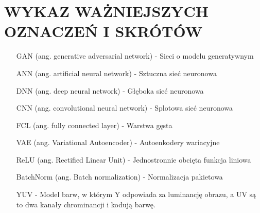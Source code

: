 \section*{WYKAZ WAŻNIEJSZYCH OZNACZEŃ I SKRÓTÓW}

  \bigskip

  \begin{itemize}
    \item[GAN] (ang. generative adversarial network) - Sieci o modelu generatywnym
    \item[ANN] (ang. artificial neural network) - Sztuczna sieć neuronowa
    \item[DNN] (ang. deep neural network) - Głęboka sieć neuronowa
    \item[CNN] (ang. convolutional neural network) - Splotowa sieć neuronowa
    \item[FCL] (ang. fully connected layer) - Warstwa gęsta
    \item[VAE] (ang. Variational Autoencoder) - Autoenkodery wariacyjne
    \item[ReLU] (ang. Rectified Linear Unit) - Jednostronnie obcięta funkcja liniowa
    \item[BatchNorm] (ang. Batch normalization) - Normalizacja pakietowa
    \item[YUV] - Model barw, w którym Y odpowiada za luminancję obrazu, a UV
    są to dwa kanały chrominancji i kodują barwę.

  \end{itemize}

